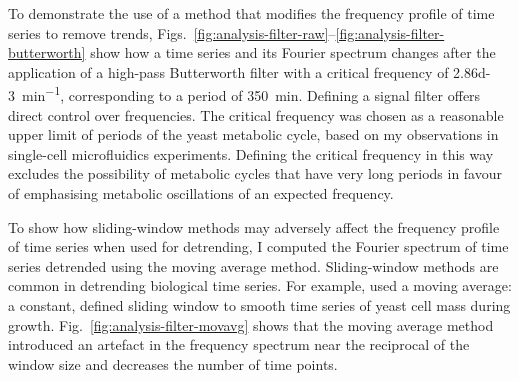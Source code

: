 
To demonstrate the use of a method that modifies the frequency profile of time series to remove trends, Figs.\ \ref{fig:analysis-filter-raw}--\ref{fig:analysis-filter-butterworth} show how a time series and its Fourier spectrum changes after the application of a high-pass Butterworth filter with a critical frequency of \SI{2.86d-3}{\minute^{-1}}, corresponding to a period of \SI{350}{\minute}.
Defining a signal filter offers direct control over frequencies.
The critical frequency was chosen as a reasonable upper limit of periods of the yeast metabolic cycle, based on my observations in single-cell microfluidics experiments.
Defining the critical frequency in this way excludes the possibility of metabolic cycles that have very long periods in favour of emphasising metabolic oscillations of an expected frequency.

To show how sliding-window methods may adversely affect the frequency profile of time series when used for detrending, I computed the Fourier spectrum of time series detrended using the moving average method.
Sliding-window methods are common in detrending biological time series.
For example, \textcite{cunyHighresolutionMassMeasurements2022} used a moving average: a constant, defined sliding window to smooth time series of yeast cell mass during growth.
%
Fig.\ \ref{fig:analysis-filter-movavg} shows that the moving average method introduced an artefact in the frequency spectrum near the reciprocal of the window size and decreases the number of time points.

